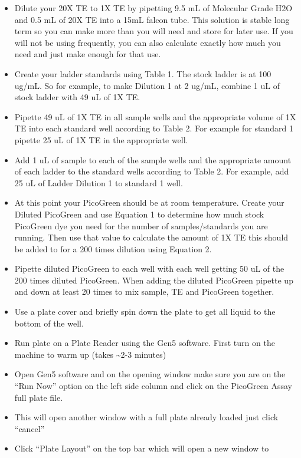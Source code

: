\documentclass[
  letterpaper,
  DIV=11,
  numbers=noendperiod]{scrreprt}
\begin{document}
\begin{itemize}
\item
  Dilute your 20X TE to 1X TE by pipetting 9.5 mL of Molecular Grade H2O
  and 0.5 mL of 20X TE into a 15mL falcon tube. This solution is stable
  long term so you can make more than you will need and store for later
  use. If you will not be using frequently, you can also calculate
  exactly how much you need and just make enough for that use.
\item
  Create your ladder standards using Table 1. The stock ladder is at 100
  ug/mL. So for example, to make Dilution 1 at 2 ug/mL, combine 1 uL of
  stock ladder with 49 uL of 1X TE.
\item
  Pipette 49 uL of 1X TE in all sample wells and the appropriate volume
  of 1X TE into each standard well according to Table 2. For example for
  standard 1 pipette 25 uL of 1X TE in the appropriate well.
\item
  Add 1 uL of sample to each of the sample wells and the appropriate
  amount of each ladder to the standard wells according to Table 2. For
  example, add 25 uL of Ladder Dilution 1 to standard 1 well.
\item
  At this point your PicoGreen should be at room temperature. Create
  your Diluted PicoGreen and use Equation 1 to determine how much stock
  PicoGreen dye you need for the number of samples/standards you are
  running. Then use that value to calculate the amount of 1X TE this
  should be added to for a 200 times dilution using Equation 2.
\item
  Pipette diluted PicoGreen to each well with each well getting 50 uL of
  the 200 times diluted PicoGreen. When adding the diluted PicoGreen
  pipette up and down at least 20 times to mix sample, TE and PicoGreen
  together.
\item
  Use a plate cover and briefly spin down the plate to get all liquid to
  the bottom of the well.
\item
  Run plate on a Plate Reader using the Gen5 software. First turn on the
  machine to warm up (takes \textasciitilde2-3 minutes)
\item
  Open Gen5 software and on the opening window make sure you are on the
  ``Run Now'' option on the left side column and click on the PicoGreen
  Assay full plate file.
\item
  This will open another window with a full plate already loaded just
  click ``cancel''
\item
  Click ``Plate Layout'' on the top bar which will open a new window to

\end{itemize}
\end{document}
